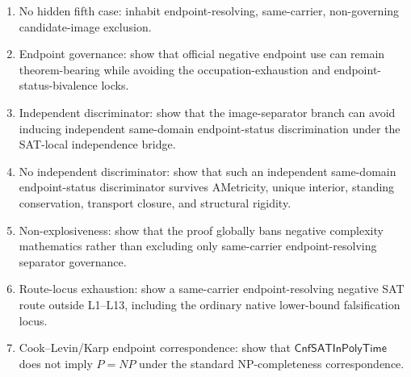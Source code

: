 \documentclass[11pt]{article}
\theoremstyle{definition}
\theoremstyle{remark}
\newcommand{\CnfSATP}{\mathsf{CnfSATInPolyTime}}
\begin{document}
\begin{enumerate}
\item No hidden fifth case: inhabit endpoint-resolving, same-carrier, non-governing candidate-image exclusion.
\item Endpoint governance: show that official negative endpoint use can remain theorem-bearing while avoiding the occupation-exhaustion and endpoint-status-bivalence locks.
\item Independent discriminator: show that the image-separator branch can avoid inducing independent same-domain endpoint-status discrimination under the SAT-local independence bridge.
\item No independent discriminator: show that such an independent same-domain endpoint-status discriminator survives AMetricity, unique interior, standing conservation, transport closure, and structural rigidity.
\item Non-explosiveness: show that the proof globally bans negative complexity mathematics rather than excluding only same-carrier endpoint-resolving separator governance.
\item Route-locus exhaustion: show a same-carrier endpoint-resolving negative SAT route outside L1--L13, including the ordinary native lower-bound falsification locus.
\item Cook--Levin/Karp endpoint correspondence: show that \(\CnfSATP\) does not imply \(P=NP\) under the standard NP-completeness correspondence.
\end{enumerate}
\end{document}
